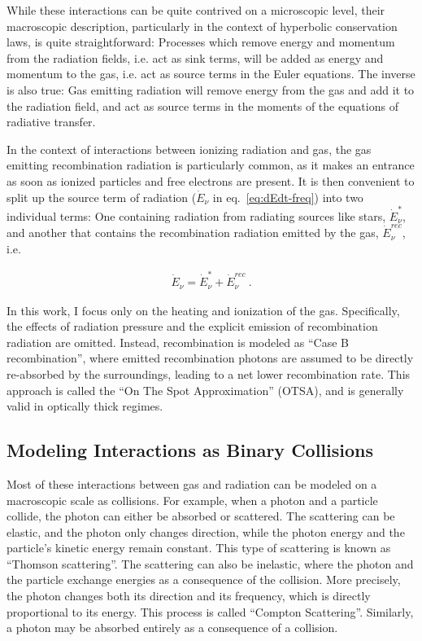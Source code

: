 While these interactions can be quite contrived on a microscopic level, their macroscopic
description, particularly in the context of hyperbolic conservation laws, is quite straightforward:
Processes which remove energy and momentum from the radiation fields, i.e. act as sink terms, will
be added as energy and momentum to the gas, i.e. act as source terms in the Euler equations. The
inverse is also true: Gas emitting radiation will remove energy from the gas and add it to the
radiation field, and act as source terms in the moments of the equations of radiative transfer.

In the context of interactions between ionizing radiation and gas, the gas emitting recombination
radiation is particularly common, as it makes an entrance as soon as ionized particles and free
electrons are present. It is then convenient to split up the source term of radiation ($\dot{E}_\nu$
in eq.~\ref{eq:dEdt-freq}) into two individual terms: One containing radiation from radiating
sources like stars, $\dot{E}_\nu^*$, and another that contains the recombination radiation emitted
by the gas, $\dot{E}_\nu^{rec}$, i.e.

\begin{align}
 \dot{E}_\nu = \dot{E}_\nu^* + \dot{E}_\nu^{rec} \ . \label{eq:split-injection-terms}
\end{align}

In this work, I focus only on the heating and ionization of the gas. Specifically, the effects of
radiation pressure and the explicit emission of recombination radiation are omitted. Instead,
recombination is modeled as ``Case B recombination'', where emitted recombination photons are
assumed to be directly re-absorbed by the surroundings, leading to a net lower recombination rate.
This approach is called the ``On The Spot Approximation'' (OTSA), and is generally valid in
optically thick regimes.








\subsection{Modeling Interactions as Binary Collisions}

Most of these interactions between gas and radiation can be modeled on a macroscopic scale as
collisions. For example, when a photon and a particle collide, the photon can either be absorbed or
scattered. The scattering can be elastic, and the photon only changes direction, while the photon
energy and the particle's kinetic energy remain constant. This type of scattering is known as
``Thomson scattering''. The scattering can also be inelastic, where the photon and the particle
exchange energies as a consequence of the collision. More precisely, the photon changes both its
direction and its frequency, which is directly proportional to its energy. This process is called
``Compton  Scattering''. Similarly, a photon may be absorbed entirely as a consequence of a
collision.

